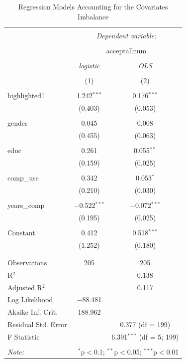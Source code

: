 \documentclass[
  11pt,
  letterpaper,
]{article}
\begin{document}
\begin{table}[!htbp] \centering 
  \caption{Regression Models Accounting for the Covariates Imbalance} 
  \label{} 
\begin{tabular}{@{\extracolsep{5pt}}lcc} 
\\[-1.8ex]\hline 
\hline \\[-1.8ex] 
 & \multicolumn{2}{c}{\textit{Dependent variable:}} \\ 
\cline{2-3} 
\\[-1.8ex] & \multicolumn{2}{c}{acceptallnum} \\ 
\\[-1.8ex] & \textit{logistic} & \textit{OLS} \\ 
\\[-1.8ex] & (1) & (2)\\ 
\hline \\[-1.8ex] 
 highlighted1 & 1.242$^{***}$ & 0.176$^{***}$ \\ 
  & (0.403) & (0.053) \\ 
  & & \\ 
 gender & 0.045 & 0.008 \\ 
  & (0.455) & (0.063) \\ 
  & & \\ 
 educ & 0.261 & 0.055$^{**}$ \\ 
  & (0.159) & (0.025) \\ 
  & & \\ 
 comp\_use & 0.342 & 0.053$^{*}$ \\ 
  & (0.210) & (0.030) \\ 
  & & \\ 
 years\_comp & $-$0.522$^{***}$ & $-$0.072$^{***}$ \\ 
  & (0.195) & (0.025) \\ 
  & & \\ 
 Constant & 0.412 & 0.518$^{***}$ \\ 
  & (1.252) & (0.180) \\ 
  & & \\ 
\hline \\[-1.8ex] 
Observations & 205 & 205 \\ 
R$^{2}$ &  & 0.138 \\ 
Adjusted R$^{2}$ &  & 0.117 \\ 
Log Likelihood & $-$88.481 &  \\ 
Akaike Inf. Crit. & 188.962 &  \\ 
Residual Std. Error &  & 0.377 (df = 199) \\ 
F Statistic &  & 6.391$^{***}$ (df = 5; 199) \\ 
\hline 
\hline \\[-1.8ex] 
\textit{Note:}  & \multicolumn{2}{r}{$^{*}$p$<$0.1; $^{**}$p$<$0.05; $^{***}$p$<$0.01} \\ 
\end{tabular} 
\end{table}
\end{document}
